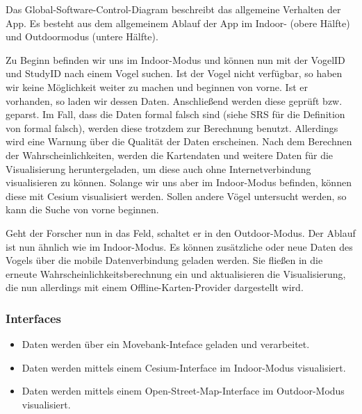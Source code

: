 \documentclass[12pt]{article} %
\begin{document}
\vspace{1em}

Das Global-Software-Control-Diagram beschreibt das allgemeine Verhalten der App. Es besteht aus dem allgemeinem Ablauf der App im Indoor- (obere Hälfte) und Outdoormodus (untere Hälfte). 

Zu Beginn befinden wir uns im Indoor-Modus und können nun mit der VogelID und StudyID nach einem Vogel suchen. Ist der Vogel nicht verfügbar, so haben wir keine Möglichkeit weiter zu machen und beginnen von vorne. Ist er vorhanden, so laden wir dessen Daten. Anschließend werden diese geprüft bzw. geparst. Im Fall, dass die Daten formal falsch sind (siehe SRS für die Definition von formal falsch), werden diese trotzdem zur Berechnung benutzt. Allerdings wird eine Warnung über die Qualität der Daten erscheinen. Nach dem Berechnen der Wahrscheinlichkeiten, werden die Kartendaten und weitere Daten für die Visualisierung heruntergeladen, um diese auch ohne Internetverbindung visualisieren zu können. Solange wir uns aber im Indoor-Modus befinden, können diese mit Cesium visualisiert werden. Sollen andere Vögel untersucht werden, so kann die Suche von vorne beginnen.

Geht der Forscher nun in das Feld, schaltet er in den Outdoor-Modus. Der Ablauf ist nun ähnlich wie im Indoor-Modus. Es können zusätzliche oder neue Daten des Vogels über die mobile Datenverbindung geladen werden. Sie fließen in die erneute Wahrscheinlichkeitsberechnung ein und aktualisieren die Visualisierung, die nun allerdings mit einem Offline-Karten-Provider dargestellt wird. 

\subsubsection{Interfaces}
\label{sec:interfaces}
\begin{itemize}
	\item Daten werden über ein Movebank-Inteface geladen und verarbeitet. 
	\item Daten werden mittels einem Cesium-Interface im Indoor-Modus visualisiert.
	\item Daten werden mittels einem Open-Street-Map-Interface im Outdoor-Modus visualisiert.
\end{itemize}

\end{document}
